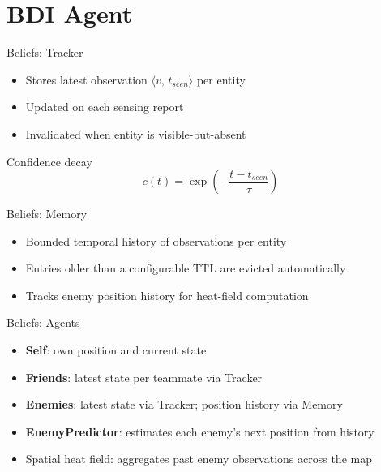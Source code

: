 \section{BDI Agent}

\begin{frame}{Beliefs: Tracker}
  \begin{itemize}
    \item Stores latest observation $\langle v,\, t_{seen} \rangle$ per entity
    \item Updated on each sensing report
    \item Invalidated when entity is visible-but-absent
  \end{itemize}
  \begin{block}{Confidence decay}
    \[ c(t) = \exp\!\left(-\frac{t - t_{seen}}{\tau}\right) \]
  \end{block}
\end{frame}

\begin{frame}{Beliefs: Memory}
  \begin{itemize}
    \item Bounded temporal history of observations per entity
    \item Entries older than a configurable TTL are evicted automatically
    \item Tracks enemy position history for heat-field computation
  \end{itemize}
\end{frame}

\begin{frame}{Beliefs: Agents}
  \begin{itemize}
    \item \textbf{Self}: own position and current state
    \item \textbf{Friends}: latest state per teammate via Tracker
    \item \textbf{Enemies}: latest state via Tracker; position history via Memory
    \item \textbf{EnemyPredictor}: estimates each enemy's next position from history
    \item Spatial heat field: aggregates past enemy observations across the map
  \end{itemize}
\end{frame}


